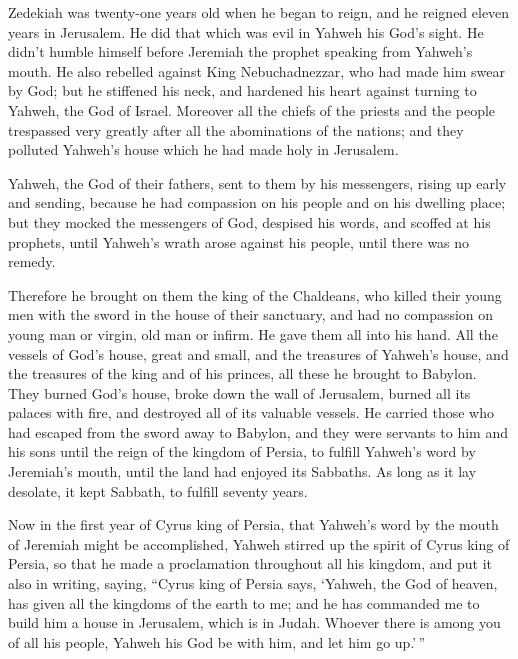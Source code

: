  Zedekiah was twenty-one years old when he began to
reign, and he reigned eleven years in Jerusalem.  He did
that which was evil in Yahweh his God's sight. He didn't humble himself
before Jeremiah the prophet speaking from Yahweh's mouth.
 He also rebelled against King Nebuchadnezzar, who had
made him swear by God; but he stiffened his neck, and hardened his heart
against turning to Yahweh, the God of Israel.  Moreover
all the chiefs of the priests and the people trespassed very greatly
after all the abominations of the nations; and they polluted Yahweh's
house which he had made holy in Jerusalem.

 Yahweh, the God of their fathers, sent to them by his
messengers, rising up early and sending, because he had compassion on
his people and on his dwelling place;  but they mocked
the messengers of God, despised his words, and scoffed at his prophets,
until Yahweh's wrath arose against his people, until there was no
remedy.

 Therefore he brought on them the king of the Chaldeans,
who killed their young men with the sword in the house of their
sanctuary, and had no compassion on young man or virgin, old man or
infirm. He gave them all into his hand.  All the vessels
of God's house, great and small, and the treasures of Yahweh's house,
and the treasures of the king and of his princes, all these he brought
to Babylon.  They burned God's house, broke down the wall
of Jerusalem, burned all its palaces with fire, and destroyed all of its
valuable vessels.  He carried those who had escaped from
the sword away to Babylon, and they were servants to him and his sons
until the reign of the kingdom of Persia,  to fulfill
Yahweh's word by Jeremiah's mouth, until the land had enjoyed its
Sabbaths. As long as it lay desolate, it kept Sabbath, to fulfill
seventy years.

 Now in the first year of Cyrus king of Persia, that
Yahweh's word by the mouth of Jeremiah might be accomplished, Yahweh
stirred up the spirit of Cyrus king of Persia, so that he made a
proclamation throughout all his kingdom, and put it also in writing,
saying,  ``Cyrus king of Persia says, `Yahweh, the God of
heaven, has given all the kingdoms of the earth to me; and he has
commanded me to build him a house in Jerusalem, which is in Judah.
Whoever there is among you of all his people, Yahweh his God be with
him, and let him go up.'\,''
